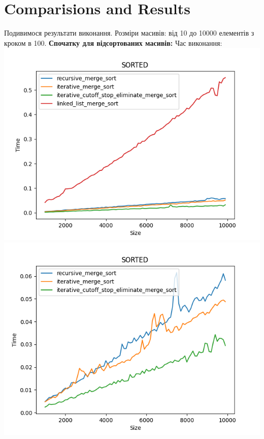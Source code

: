 \documentclass{article}
\begin{document}
    \section{Comparisions and Results}
        Подивимося результати виконання. Розміри масивів: від 10 до 10000 елементів з кроком в 100.
        \newline
        \newpage
        \textbf{Спочатку для відсортованих масивів:}
        \newline
        Час виконання:
        \newline
            \includegraphics[scale=0.5]{sorted_Time_4_sorts_90_numbers_50.png}
            \includegraphics[scale=0.5]{sorted_Time_3_sorts_90_numbers_50.png}
        \newline
\end{document}
